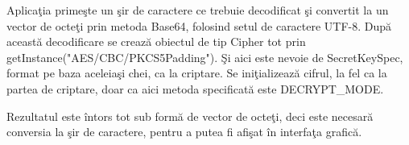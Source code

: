 \lstset{caption=Cod folosit pentru decriptare,
label=lst:decriptare}
 

Aplica\c{t}ia prime\c{s}te un \c{s}ir de caractere ce trebuie decodificat \c{s}i convertit la un vector de octe\c{t}i prin metoda Base64, folosind setul de caractere UTF-8. Dup\u{a} aceast\u{a} decodificare se creaz\u{a} obiectul de tip Cipher tot prin getInstance("AES/CBC/PKCS5Padding"). \c{S}i aici este nevoie de  SecretKeySpec, format pe baza aceleia\c{s}i chei, ca la criptare. Se ini\c{t}ializeaz\u{a} cifrul, la fel ca la partea de criptare, doar ca aici metoda specificat\u{a} este DECRYPT_MODE.

Rezultatul este \^{i}ntors tot sub form\u{a} de vector de octe\c{t}i, deci este necesar\u{a} conversia la \c{s}ir de caractere, pentru a putea fi afi\c{s}at \^{i}n interfa\c{t}a grafic\u{a}.

 